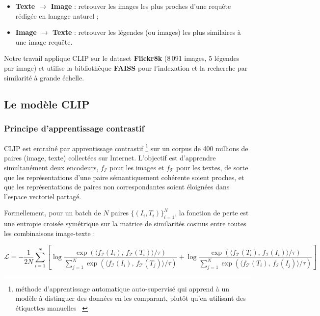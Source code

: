\documentclass[a4paper,11pt]{article}
\begin{document}
\begin{itemize}
    \item \textbf{Texte $\rightarrow$ Image} : retrouver les images les plus proches
          d'une requête rédigée en langage naturel ;
    \item \textbf{Image $\rightarrow$ Texte} : retrouver les légendes (ou images)
          les plus similaires à une image requête.
\end{itemize}
 
Notre travail applique CLIP sur le dataset \textbf{Flickr8k}
(8\,091 images, 5 légendes par image) et utilise la bibliothèque
\textbf{FAISS} pour l'indexation et la recherche par similarité à grande échelle.
 
\subsection{Le modèle CLIP}
 
\subsubsection{Principe d'apprentissage contrastif}
 
CLIP est entraîné par apprentissage contrastif \footnote{méthode d'apprentissage automatique auto-supervisé qui apprend à un modèle à distinguer des données en les comparant, plutôt qu'en utilisant des étiquettes manuelles ~\cite{ultralytics_contrastive}} sur un corpus de
400 millions de paires (image, texte) collectées sur Internet.
L'objectif est d'apprendre simultanément deux encodeurs,
$f_{\mathcal{I}}$ pour les images et $f_{\mathcal{T}}$ pour les textes,
de sorte que les représentations d'une paire sémantiquement cohérente
soient proches, et que les représentations de paires non correspondantes
soient éloignées dans l'espace vectoriel partagé.
 
Formellement, pour un batch de $N$ paires $\{(I_i, T_i)\}_{i=1}^{N}$,
la fonction de perte est une entropie croisée symétrique sur la matrice
de similarités cosinus entre toutes les combinaisons image-texte :
 
\begin{equation}
    \mathcal{L} = -\frac{1}{2N}\sum_{i=1}^{N}
    \left[
        \log \frac{\exp\!\left(\langle f_{\mathcal{I}}(I_i),\,
        f_{\mathcal{T}}(T_i)\rangle / \tau\right)}
        {\sum_{j=1}^{N}\exp\!\left(\langle f_{\mathcal{I}}(I_i),\,
        f_{\mathcal{T}}(T_j)\rangle / \tau\right)}
        +
        \log \frac{\exp\!\left(\langle f_{\mathcal{T}}(T_i),\,
        f_{\mathcal{I}}(I_i)\rangle / \tau\right)}
        {\sum_{j=1}^{N}\exp\!\left(\langle f_{\mathcal{T}}(T_i),\,
        f_{\mathcal{I}}(I_j)\rangle / \tau\right)}
    \right]
\end{equation}
 
\end{document}
